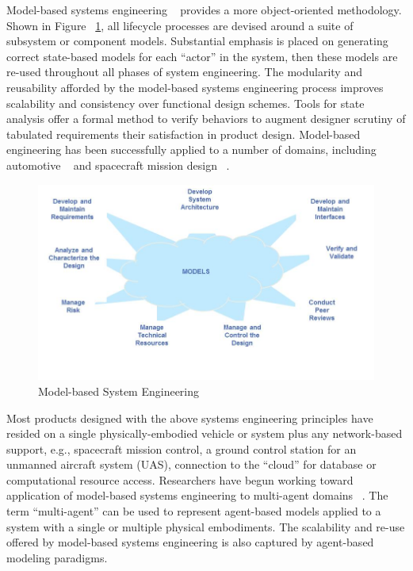 Model-based systems engineering ~\cite{balmelli2006model, estefan2007survey}
provides a more object-oriented methodology.
Shown in Figure ~\ref{fig:model-based-system-eng}, all lifecycle processes are
devised around a suite of subsystem or component models.  Substantial emphasis
is placed on generating correct state-based models for each ``actor'' in the
system, then these models are re-used throughout all phases of system engineering.
The modularity and reusability afforded by the model-based systems engineering process
improves scalability and consistency over functional design schemes.  Tools for state analysis 
offer a formal method to verify behaviors to augment designer scrutiny of 
tabulated requirements their satisfaction in product design.
Model-based engineering has been successfully applied to a number of domains,
including automotive ~\cite{pretschner2007software, bringmann2008model} and 
spacecraft mission design ~\cite{dvorak2000software}.

\begin{figure}[h] 
\centering
   \includegraphics[width=6.5in]{model-based-system-eng.jpg} 
   \caption{Model-based System Engineering~\cite{dvorak2000software}}
   \label{fig:model-based-system-eng}
\end{figure}

Most products designed with the above systems engineering principles have resided on
a single physically-embodied vehicle or system plus any network-based support, 
e.g., spacecraft mission control, a ground control station for an unmanned aircraft system (UAS), 
connection to the ``cloud'' for database or computational resource access.  Researchers have begun working toward
application of model-based systems engineering to multi-agent domains ~\cite{gascuena2012model}.
The term ``multi-agent'' can be used to represent agent-based models applied to a system 
with a single or multiple physical embodiments.  The scalability and re-use offered by 
model-based systems engineering is also captured by agent-based modeling paradigms.

